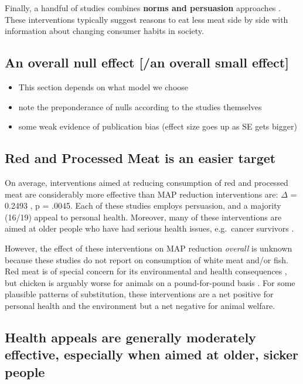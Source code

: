 \documentclass[sn-nature,pdflatex]{sn-jnl}
\providecommand{\tightlist}{%
  \setlength{\itemsep}{0pt}\setlength{\parskip}{0pt}}
\begin{document}
Finally, a handful of studies combines \textbf{norms and persuasion}
approaches
\citep{hennessy2016, carfora2023, lacroix2020, mattson2020, piester2020}.
These interventions typically suggest reasons to eat less meat side by
side with information about changing consumer habits in society.

\subsection{An overall null effect {[}/an overall small
effect{]}}\label{an-overall-null-effect-an-overall-small-effect}

\begin{itemize}
\tightlist
\item
  This section depends on what model we choose
\item
  note the preponderance of nulls according to the studies themselves
\item
  some weak evidence of publication bias (effect size goes up as SE gets
  bigger)
\end{itemize}

\subsection{Red and Processed Meat is an easier
target}\label{red-and-processed-meat-is-an-easier-target}

On average, interventions aimed at reducing consumption of red and
processed meat are considerably more effective than MAP reduction
interventions are: \(\Delta\) = 0.2493 , p = .0045.
Each of these studies employs persuasion, and a majority (16/19) appeal
to personal health. Moreover, many of these interventions are aimed at
older people who have had serious health issues, e.g.~cancer survivors
\citep{lee2018, james2015}.

However, the effect of these interventions on MAP reduction
\emph{overall} is unknown because these studies do not report on
consumption of white meat and/or fish. Red meat is of special concern
for its environmental and health consequences \citep{grummon2023}, but
chicken is arguably worse for animals on a pound-for-pound basis
\citep{mathur2022}. For some plausible patterns of substitution, these
interventions are a net positive for personal health and the environment
but a net negative for animal welfare.

\subsection{Health appeals are generally moderately effective,
especially when aimed at older, sicker
people}\label{health-appeals-are-generally-moderately-effective-especially-when-aimed-at-older-sicker-people}
\end{document}
